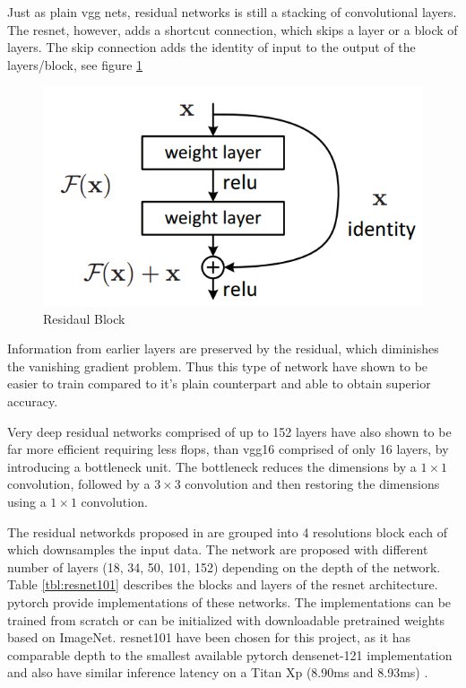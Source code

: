 Just as plain \gls{vgg} nets, residual networks is still a stacking of  convolutional layers. The \gls{resnet}, however, adds a shortcut connection, which skips a layer or a block of layers. The skip connection adds the identity of input to the output of the layers/block, see figure \ref{fig:residualblock}

\begin{figure}
	\centering
	\includegraphics[width=.5\linewidth]{figures/models/residualblock}
	\caption[Residual Block]{Residaul Block}
	\label{fig:residualblock}
\end{figure}

Information from earlier layers are preserved by the residual, which diminishes the vanishing gradient problem. Thus this type of network have shown to be easier to train compared to it’s plain counterpart and able to obtain superior accuracy.  

Very deep residual networks comprised of up to 152 layers have also shown to be far more efficient requiring less \gls{flop}s, than \gls{vgg}16 comprised of only 16 layers, by introducing a bottleneck unit. The bottleneck reduces the dimensions by a $1 \times 1$ convolution, followed by a $3 \times 3$ convolution and then restoring the dimensions using a $1 \times 1$ convolution. 

The residual networkds proposed in \cite{he_deep_2015} are grouped into 4 resolutions block each of which downsamples the input data. The network are proposed with different number of layers (18, 34, 50, 101, 152) depending on the depth of the network. Table \ref{tbl:resnet101} describes the blocks and layers of the \gls{resnet} architecture. \gls{pytorch} provide implementations of these networks. The implementations can be trained from scratch or can be initialized with downloadable pretrained weights based on ImageNet. \gls{resnet}101 have been chosen for this project, as it has comparable depth to the smallest available \gls{pytorch} \gls{densenet}-121 implementation and also have similar inference latency on a Titan Xp (8.90ms and 8.93ms) \cite{bianco_benchmark_2018}.

